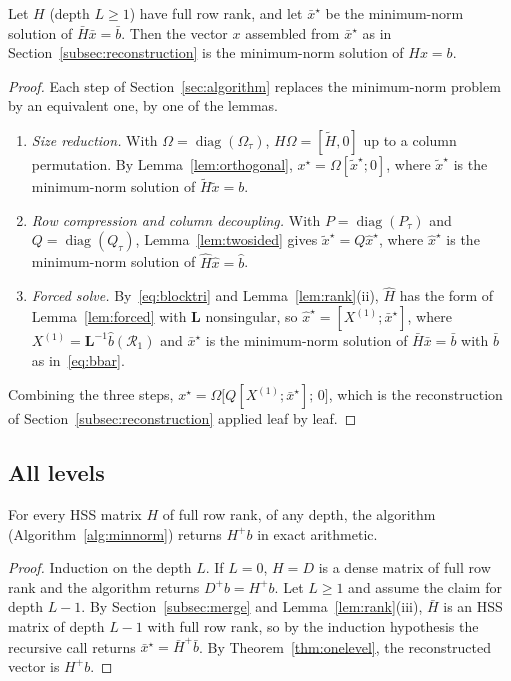 \begin{theorem}\label{thm:onelevel}
Let $H$ (depth $L\ge1$) have full row rank, and let $\bar x^\star$ be the minimum-norm solution of
$\bar H\bar x=\bar b$. Then the vector $x$ assembled from $\bar x^\star$ as in
Section~\ref{subsec:reconstruction} is the minimum-norm solution of $Hx=b$.
\end{theorem}
\begin{proof}
Each step of Section~\ref{sec:algorithm} replaces the minimum-norm problem by an equivalent one, by one of
the lemmas.
\begin{enumerate}[leftmargin=1.5em,itemsep=2pt]
\item \emph{Size reduction.} With $\Omega=\operatorname{diag}(\Omega_\tau)$, $H\Omega=[\tilde H,0]$ up to a column
permutation. By Lemma~\ref{lem:orthogonal}, $x^\star=\Omega[\tilde x^\star;0]$, where $\tilde x^\star$ is the
minimum-norm solution of $\tilde H\tilde x=b$.
\item \emph{Row compression and column decoupling.} With $P=\operatorname{diag}(P_\tau)$ and
$Q=\operatorname{diag}(Q_\tau)$, Lemma~\ref{lem:twosided} gives $\tilde x^\star=Q\hat x^\star$, where
$\hat x^\star$ is the minimum-norm solution of $\hat H\hat x=\hat b$.
\item \emph{Forced solve.} By~\eqref{eq:blocktri} and Lemma~\ref{lem:rank}(ii), $\hat H$ has the form of
Lemma~\ref{lem:forced} with $\mathbf L$ nonsingular, so $\hat x^\star=[X^{(1)};\bar x^\star]$, where
$X^{(1)}=\mathbf L^{-1}\hat b(\mathcal R_1)$ and $\bar x^\star$ is the minimum-norm solution of $\bar H\bar x=\bar b$
with $\bar b$ as in~\eqref{eq:bbar}.
\end{enumerate}
Combining the three steps, $x^\star=\Omega\big[Q[X^{(1)};\bar x^\star];\,0\big]$, which is the reconstruction of
Section~\ref{subsec:reconstruction} applied leaf by leaf.
\end{proof}

\subsection{All levels}

\begin{theorem}\label{thm:general}
For every HSS matrix $H$ of full row rank, of any depth, the algorithm (Algorithm~\ref{alg:minnorm})
returns $H^+b$ in exact arithmetic.
\end{theorem}
\begin{proof}
Induction on the depth $L$. If $L=0$, $H=D$ is a dense matrix of full row rank and the algorithm returns
$D^+b=H^+b$. Let $L\ge1$ and assume the claim for depth $L-1$. By Section~\ref{subsec:merge} and
Lemma~\ref{lem:rank}(iii), $\bar H$ is an HSS matrix of depth $L-1$ with full row rank, so by the induction
hypothesis the recursive call returns $\bar x^\star=\bar H^+\bar b$. By Theorem~\ref{thm:onelevel}, the
reconstructed vector is $H^+b$.
\end{proof}

